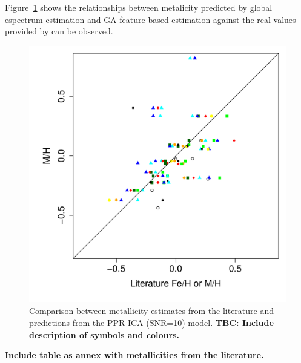  Figure~\ref{M_ICA_10} shows the relationships between metalicity
 predicted by global espectrum estimation and GA feature based
 estimation against the real values provided by
 \cite{2013A&A...549A.129C} can be observed.

 \begin {figure}
  \centering
   \includegraphics[width=\textwidth]{figs/teff-logg/M-ICA10.pdf}
   \caption{Comparison between metallicity estimates from the
     literature and predictions from the PPR-ICA (SNR=10) model. {\bf
       TBC: Include description of symbols and colours.}}
  \label{M_ICA_10}
 \end {figure}

 {\bf Include table as annex with metallicities from the literature.}
